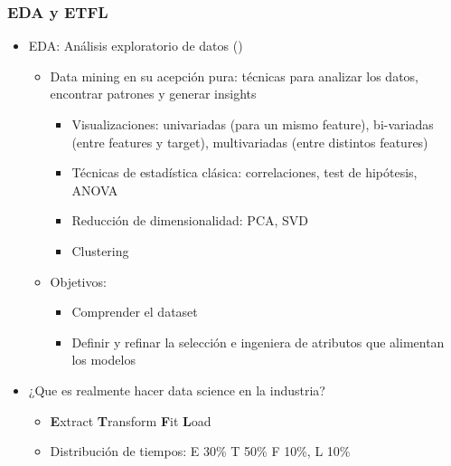 \documentclass[leqno, 10pt, envcountsect]{beamer}
\numberwithin{equation}{section}
\theoremstyle{definition}
\theoremstyle{example}
\numberwithin{figure}{section}
\numberwithin{table}{section}
\let\olditem\item
\renewcommand{\item}{%
\olditem\vspace{1pt}}
\begin{document}
\begin{frame}[fragile=singleslide]
  \frametitle{EDA y ETFL}
  \begin{itemize}
    \item EDA: Análisis exploratorio de datos  (\textcite{tukey77})
      \begin{itemize}
        \item Data mining en su acepción pura: técnicas para analizar
          los datos, encontrar patrones y generar insights
          \begin{itemize}
            \item Visualizaciones: univariadas (para un mismo feature),
              bi-variadas (entre features y target), multivariadas (entre
              distintos features)
            \item Técnicas de estadística clásica: correlaciones, test de
              hipótesis, ANOVA
            \item Reducción de dimensionalidad: PCA, SVD
            \item Clustering
          \end{itemize}
        \item Objetivos:
          \begin{itemize}
            \item Comprender el dataset
            \item Definir y refinar la selección e ingeniera de atributos que
              alimentan los modelos
          \end{itemize}
      \end{itemize}
  \end{itemize}

  \begin{itemize}
    \item ¿Que es realmente hacer data science en la industria?
      \begin{itemize}
        \item \textbf{E}xtract \textbf{T}ransform \textbf{F}it \textbf{L}oad
        \item Distribución de tiempos: E 30\% T 50\% F 10\%, L 10\%
      \end{itemize}
  \end{itemize}
\end{frame}
\end{document}
